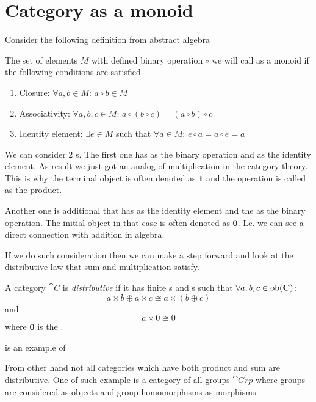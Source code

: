 \section{Category as a monoid}
\label{sec:category_as_monoid}
Consider the following definition from abstract algebra
\begin{definition}[Monoid]
  \label{def:monoid}
  The set of elements $M$ with defined binary operation $\circ$ we will call
  as a monoid if the following conditions are satisfied.
  \begin{enumerate}
  \item Closure: $\forall a, b \in M$: $a \circ b \in M$
  \item Associativity: $\forall a, b, c \in M$:
    $a \circ \left( b \circ c \right) =
    \left( a \circ b \right) \circ c$
  \item Identity element: $\exists e \in M$ such that
    $\forall a \in M$: $e \circ a = a \circ e = a$
  \end{enumerate}
\end{definition}

We can consider 2 s. The first one has
 as the binary operation and
 as the identity element. As result we
just got an analog of multiplication in the category theory. This is why
the terminal object is often denoted as $\mathbf{1}$ and the operation
is called as the product. 

Another one is additional  that has
 as the identity element and the
 as the binary operation. The initial object in
that case  is often denoted as $\mathbf{0}$. I.e. we can see a direct
connection with addition in algebra.

If we do such consideration then we can make a step forward and look
at the distributive law that sum and multiplication satisfy.
\begin{definition}
\label{def:distributive_category}
A category $\cat{C}$ is \textit{distributive} if 
\cite{wiki:distributive_category}
it has finite
s and s such that 
$\forall a,b,c \in \mathrm{ob}(\mathbf{C})$:
\[
a \times b \oplus a \times c \cong a \times ( b \oplus c )
\]
and 
\[
a \times 0 \cong 0
\]
where $\mathbf{0}$ is the .
\end{definition} 

\begin{example}
\label{ex:distributive_category}
 is an example 
\cite{wiki:distributive_category}
of 

From other hand not all categories which have both product and sum are
distributive. One of such example is a category of all groups
\cite{wiki:distributive_category} 
$\cat{Grp}$ where groups are considered as objects and group
homomorphisms as morphisms. 
\end{example}

